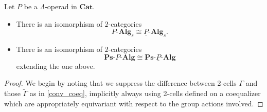\documentclass{amsbook} %
\newcommand{\mb}{\mathbf}
\numberwithin{section}{chapter}
\begin{document}
\begin{thm}
Let $P$ be a $\Lambda$-operad in $\mb{Cat}$.
\begin{itemize}
\item There is an isomorphism of $2$-categories
    \[
        P\mbox{-}\mb{Alg}_{s} \cong \underline{P}\mbox{-}\mb{Alg}_{s}.
    \]
\item There is an isomorphism of $2$-categories
    \[
        \mb{Ps}\mbox{-}P\mbox{-}\mb{Alg} \cong \mb{Ps}\mbox{-}\underline{P}\mbox{-}\mb{Alg}
    \]
    extending the one above.
\end{itemize}
\end{thm}
\begin{proof}
We begin by noting that we suppress the difference between 2-cells $\Gamma$ and those $\tilde{\Gamma}$ as in \ref{conv_coeq}, implicitly always using 2-cells defined on a coequalizer which are appropriately equivariant with respect to the group actions involved.


\end{proof}
\end{document}
